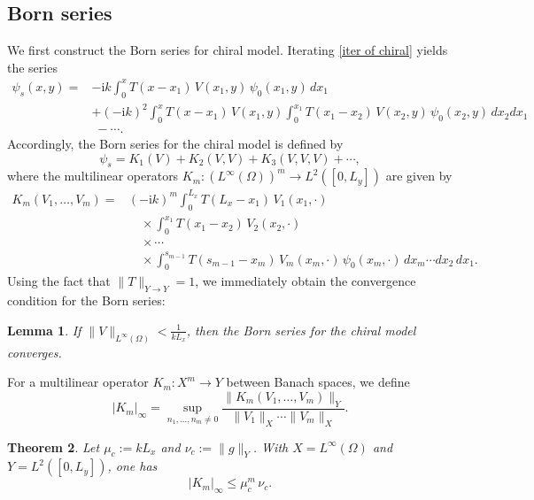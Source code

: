 \documentclass[12pt,reqno]{amsart}
\newtheorem{thm}{Theorem}[section]
\newtheorem{lem}[thm]{Lemma}
\begin{document}
\subsection{Born series}
We first construct the Born series for chiral model. Iterating \eqref{iter of chiral} yields the series
    \begin{align*}
\psi_s(x,y)
=&-\mathrm{i}k \int_0^x T(x-x_1)\,V(x_1,y)\,\psi_0(x_1,y)\,dx_1 \\
&+(-\mathrm{i}k)^2 \int_0^x T(x-x_1)\,V(x_1,y)
     \int_0^{x_1} T(x_1-x_2)\,V(x_2,y)\,\psi_0(x_2,y)\,dx_2  dx_1 \\
&\;-\cdots .
\end{align*}
Accordingly, the Born series for the chiral model is defined by
\[
    \psi_s=K_1(V)+K_2(V,V)+K_3(V,V,V)+\cdots,
\]
where the multilinear operators $K_m:(L^{\infty}(\Omega))^m\to L^2([0,L_y])$ are given by
\begin{equation}\label{chiral def of km}
\begin{aligned}
K_m(V_1,\ldots,V_m)
={}&(-\mathrm{i}k)^m
\int_0^{L_x} T(L_x-x_1)\,V_1(x_1,\cdot) \\
&\quad \times \int_0^{x_1} T(x_1-x_2)\,V_2(x_2,\cdot) \\
&\quad \times \cdots \\
&\quad \times \int_0^{s_{m-1}} T(s_{m-1}-x_m)\,V_m(x_m,\cdot)\,\psi_0(x_m,\cdot)\,
dx_m\cdots dx_2\,dx_1 .
\end{aligned}
\end{equation}
Using the fact that $\|T\|_{Y\to Y}=1$, we immediately obtain the convergence condition for the Born series:
\begin{lem}
If $\|V\|_{L^{\infty}(\Omega)}<\frac{1}{kL_x}$, then the Born series for the chiral model converges.
\end{lem}

For a multilinear operator $K_m:X^m\to Y$ between Banach spaces, we define
\[
    |K_m|_{\infty}=\sup_{n_1, \ldots, n_m \neq 0}
    \frac{\bigl\|K_m(V_1, \ldots, V_m)\bigr\|_{Y}}{\|V_1\|_{X}\cdots\|V_m\|_{X}}.
\]

\begin{thm}\label{bound of forward chiral}
Let $\mu_c:=kL_x$ and                        $\nu_c:=\|g\|_{Y}$. With $X=L^{\infty}(\Omega)$ and $Y=L^2([0,L_y])$, one has
\[
    |K_m|_{\infty}\leq \mu_c^m\,\nu_c.
\]
\end{thm}
\end{document}
